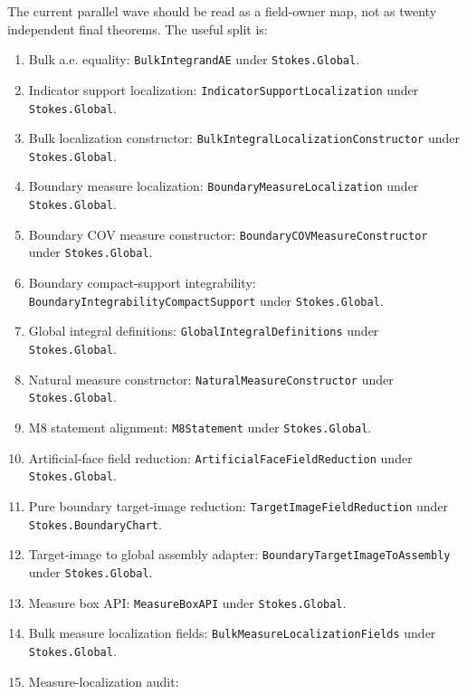\begin{proposition}
  \label{anc:m8_current_twenty_agent_split}
  \begingroup\raggedright
  The current parallel wave should be read as a field-owner map, not as twenty
  independent final theorems.  The useful split is:
  \begin{enumerate}
    \item Bulk a.e. equality:
      \texttt{BulkIntegrandAE} under \texttt{Stokes.Global}.
    \item Indicator support localization:
      \texttt{IndicatorSupportLocalization} under \texttt{Stokes.Global}.
    \item Bulk localization constructor:
      \texttt{BulkIntegralLocalizationConstructor} under
      \texttt{Stokes.Global}.
    \item Boundary measure localization:
      \texttt{BoundaryMeasureLocalization} under \texttt{Stokes.Global}.
    \item Boundary COV measure constructor:
      \texttt{BoundaryCOVMeasureConstructor} under \texttt{Stokes.Global}.
    \item Boundary compact-support integrability:
      \texttt{BoundaryIntegrabilityCompactSupport} under
      \texttt{Stokes.Global}.
    \item Global integral definitions:
      \texttt{GlobalIntegralDefinitions} under \texttt{Stokes.Global}.
    \item Natural measure constructor:
      \texttt{NaturalMeasureConstructor} under \texttt{Stokes.Global}.
    \item M8 statement alignment:
      \texttt{M8Statement} under \texttt{Stokes.Global}.
    \item Artificial-face field reduction:
      \texttt{ArtificialFaceFieldReduction} under \texttt{Stokes.Global}.
    \item Pure boundary target-image reduction:
      \texttt{TargetImageFieldReduction} under
      \texttt{Stokes.BoundaryChart}.
    \item Target-image to global assembly adapter:
      \texttt{BoundaryTargetImageToAssembly} under \texttt{Stokes.Global}.
    \item Measure box API:
      \texttt{MeasureBoxAPI} under \texttt{Stokes.Global}.
    \item Bulk measure localization fields:
      \texttt{BulkMeasureLocalizationFields} under \texttt{Stokes.Global}.
    \item Measure-localization audit:

\end{enumerate}
\end{proposition}
